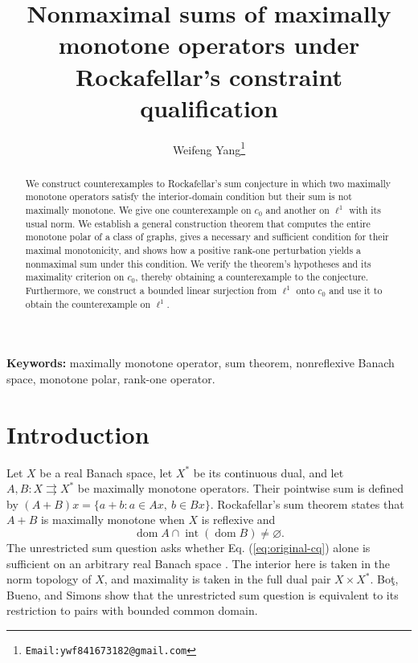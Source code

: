 \documentclass[11pt]{article}
\title{Nonmaximal sums of maximally monotone operators under Rockafellar’s constraint qualification}
\author{Weifeng Yang\thanks{\texttt{Email:ywf841673182@gmail.com}}}
\date{}
\newcommand{\dom}{\operatorname{dom}}
\theoremstyle{definition}
\theoremstyle{remark}
\begin{document}
\maketitle


\begin{abstract}


We construct counterexamples to Rockafellar's sum conjecture in which two maximally monotone operators satisfy the interior-domain condition but their sum is not maximally monotone. We give one counterexample on $c_0$ and another on $\ell^1$ with its usual norm.
We establish a general construction theorem that computes the entire monotone polar of a class of graphs, gives a necessary and sufficient condition for their maximal monotonicity, and shows how a positive rank-one perturbation yields a nonmaximal sum under this condition. We verify the theorem's hypotheses and its maximality criterion on $c_0$, thereby obtaining a counterexample to the conjecture. Furthermore, we construct a bounded linear surjection from $\ell^1$ onto $c_0$ and use it to obtain the counterexample on $\ell^1$. 





\end{abstract}


\noindent\textbf{Keywords:} maximally monotone operator, sum theorem,
nonreflexive Banach space, monotone polar, rank-one operator.

\section{Introduction}
\label{sec:introduction}
Let $X$ be a real Banach space, let $X^*$ be its continuous dual, and let $A,B:X\rightrightarrows X^*$ be maximally monotone operators. Their pointwise sum is defined by $(A+B)x=\{a+b:a\in Ax,\ b\in Bx\}$. Rockafellar's sum theorem \cite{rockafellar1970} states that $A+B$ is maximally monotone when $X$ is reflexive and
\begin{equation}
\dom A\cap\operatorname{int}(\dom B)\ne\varnothing.
\label{eq:original-cq}
\end{equation}
The unrestricted sum question asks whether Eq. (\ref{eq:original-cq}) alone is sufficient on an arbitrary real Banach space \cite{simons2008}. The interior here is taken in the norm topology of $X$, and maximality is taken in the full dual pair $X\times X^*$. Bo\c{t}, Bueno, and Simons \cite{botbuenosimons2016} show that the unrestricted sum question is equivalent to its restriction to pairs with bounded common domain.
\end{document}
